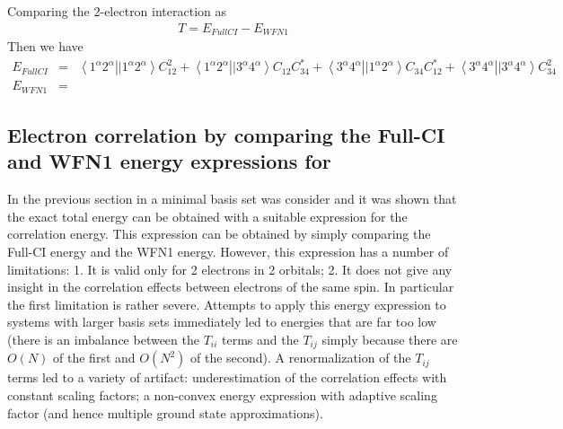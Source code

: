 \documentclass[pra,nofootinbib]{revtex4-1}
\newcommand{\erib}[4]{\left\langle #1^\alpha #2^\alpha \right.\left|| #3^\alpha #4^\alpha \right\rangle}
\begin{document}
Comparing the 2-electron interaction as
\begin{eqnarray}
  T = E_{FullCI} - E_{WFN1}
\end{eqnarray}
Then we have
\begin{eqnarray}
  E_{FullCI} &=& \erib{1}{2}{1}{2}C_{12}^2 +
                 \erib{1}{2}{3}{4}C_{12}C_{34}^* +
                 \erib{3}{4}{1}{2}C_{34}C_{12}^* +
                 \erib{3}{4}{3}{4}C_{34}^2 \\
  E_{WFN1}
  &=& 
\end{eqnarray}

\subsection{Electron correlation by comparing the Full-CI and WFN1 energy expressions for }

In the previous section  in a minimal basis set was consider and it was shown 
that the exact total energy can be obtained with a suitable expression for the 
correlation energy. This expression can be obtained by simply comparing the
Full-CI energy and the WFN1 energy. However, this expression has a number of limitations:
1. It is valid only for 2 electrons in 2 orbitals; 2. It does not give any insight in
the correlation effects between electrons of the same spin. In particular the first
limitation is rather severe. Attempts to apply this energy expression to systems with larger
basis sets immediately led to energies that are far too low (there is an imbalance between
the $T_{ii}$ terms and the $T_{ij}$ simply because there are $O(N)$ of the first and $O(N^2)$
of the second). A renormalization of the $T_{ij}$ terms led to a variety of artifact: 
underestimation of the correlation effects with constant scaling factors; a non-convex energy
expression with adaptive scaling factor (and hence multiple ground state approximations). 
\end{document}

